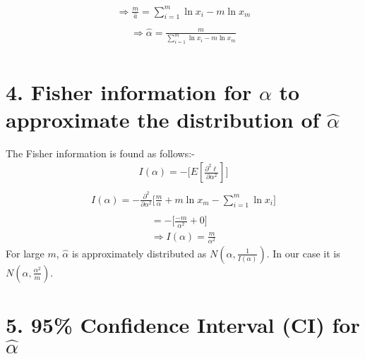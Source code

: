 \documentclass[11pt]{article}
\begin{document}
\begin{equation}
\begin{split}
\Rightarrow \frac{m}{\hat{a}}=\sum_{i=1}^{m} \ln x_{i}-m \ln x_{m} \\
\end{split}
\end{equation}
\begin{equation}
\begin{split}
\Rightarrow \boxed {\hat{\alpha}=\frac{m}{\sum_{i=1}^{m} \ln x_{i}-m \ln x_{m}}} \\
\label{eq:8}
\end{split}
\end{equation}

\section*{4. Fisher information for $\alpha$ to approximate the distribution of $\hat{\alpha}$}

The Fisher information is found as follows:-
\begin{equation}
\begin{split}
I(\alpha) = -\biggl[E\left[{\frac{\partial^{2}\ell}{\partial\alpha^{2}}}\right]\biggr] \\
\end{split}
\end{equation}
\begin{equation}
\begin{split}
I(\alpha) = -{\frac{\partial^2}{\partial \alpha^2}}\Biggl[{\frac{m}{\alpha}}+m\ln{x_m} - {\sum_{i=1}^{m} \ln x_i}\Biggr] \\
\end{split}
\end{equation}
\begin{equation}
\begin{split}
= -\biggl[{\frac{-m}{\alpha^{2}} + 0}\biggr]\\
\Rightarrow \boxed {I(\alpha)= \frac{m}{\alpha^2}}
\label{eq:11}
\end{split}
\end{equation}
For large $ m $, $ \hat\alpha $ is approximately distributed as $ N(\alpha, \frac{1}{I(\alpha)}) $. In our case it is $ N(\alpha, \frac{\alpha^2}{m}) $.

\section*{5. 95\% Confidence Interval (CI) for $\hat{\alpha}$}
\end{document}
